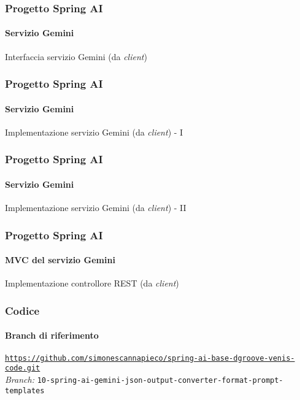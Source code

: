 %
\begin{frame}[t,fragile] \frametitle{Progetto Spring AI}
    \framesubtitle{Servizio Gemini}
        \begin{block}{Interfaccia servizio Gemini (da \textit{client})}
{\tiny}
    \end{block}
\end{frame}
%
\begin{frame}[t,fragile] \frametitle{Progetto Spring AI}
    \framesubtitle{Servizio Gemini}
		\vspace*{-.7cm}
        \begin{block}{Implementazione servizio Gemini (da \textit{client}) - I}
{\tiny}
    \end{block}
\end{frame}
%
\begin{frame}[t,fragile] \frametitle{Progetto Spring AI}
    \framesubtitle{Servizio Gemini}
    	\vspace*{-.7cm}
        \begin{block}{Implementazione servizio Gemini (da \textit{client}) - II}
{\tiny}
    \end{block}
\end{frame}
%
\begin{frame}[t,fragile] \frametitle{Progetto Spring AI}
    \framesubtitle{MVC del servizio Gemini}
    	\vspace*{-.7cm}
        \begin{block}{Implementazione controllore REST (da \textit{client})}
			{\tiny}
    	\end{block}
\end{frame}
%
\begin{frame}[fragile] \frametitle{Codice}
    \framesubtitle{Branch di riferimento}
	\begin{center}
		{\scriptsize \href{https://github.com/simonescannapieco/spring-ai-base-dgroove-venis-code.git}{\texttt{https://github.com/simonescannapieco/spring-ai-base-dgroove-venis-code.git}}}\\
		\textit{Branch:} \alert{\texttt{10-spring-ai-gemini-json-output-converter-format-prompt-templates}}
	\end{center}
\end{frame}